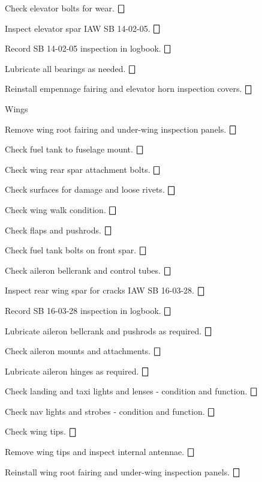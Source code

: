 \begin{enumerate*}
\begin{enumerate*}
		\item Check elevator bolts for wear. \dotfill $\bigbox$
		\item Inspect elevator spar IAW SB 14-02-05. \dotfill $\bigbox$
		\item Record SB 14-02-05 inspection in logbook. \dotfill $\bigbox$
		\item Lubricate all bearings as needed. \dotfill $\bigbox$
		\item Reinstall empennage fairing and elevator horn inspection covers. \dotfill $\bigbox$
	\end{enumerate*}
	\item{Wings} 
	\begin{enumerate*}
		\item Remove wing root fairing and under-wing inspection panels. \dotfill $\bigbox$
		\item Check fuel tank to fuselage mount. \dotfill $\bigbox$
		\item Check wing rear spar attachment bolts. \dotfill $\bigbox$
		\item Check surfaces for damage and loose rivets. \dotfill $\bigbox$
		\item Check wing walk condition. \dotfill $\bigbox$
		\item Check flaps and pushrods. \dotfill $\bigbox$
		\item Check fuel tank bolts on front spar. \dotfill $\bigbox$
		\item Check aileron bellcrank and control tubes. \dotfill $\bigbox$
		\item Inspect rear wing spar for cracks IAW SB 16-03-28. \dotfill $\bigbox$
		\item Record SB 16-03-28 inspection in logbook. \dotfill $\bigbox$
		\item Lubricate aileron bellcrank and pushrods as required. \dotfill $\bigbox$
		\item Check aileron mounts and attachments. \dotfill $\bigbox$
		\item Lubricate aileron hinges as required. \dotfill $\bigbox$
		\item Check landing and taxi lights and lenses - condition and function. \dotfill $\bigbox$
		\item Check nav lights and strobes - condition and function. \dotfill $\bigbox$
		\item Check wing tips. \dotfill $\bigbox$
		\item Remove wing tips and inspect internal antennae. \dotfill $\bigbox$
		\item Reinstall wing root fairing and under-wing inspection panels. \dotfill $\bigbox$

\end{enumerate*}
\end{enumerate*}
